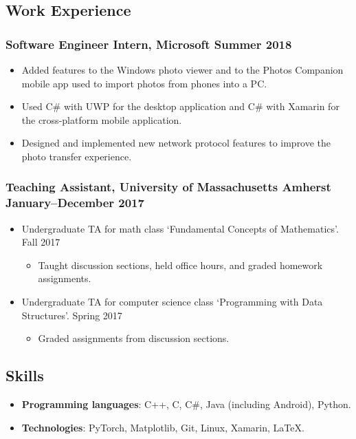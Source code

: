 \documentclass{article}
\begin{document}
	\subsection*{Work Experience}
		\subsubsection*{Software Engineer Intern, Microsoft \hfill \normalfont \normalsize Summer 2018}
        	\begin{itemize}[noitemsep,leftmargin=40pt]
            	\item Added features to the Windows photo viewer and to the Photos Companion mobile app used to import photos from phones into a PC.
                \item Used C\# with UWP for the desktop application and C\# with Xamarin for the cross-platform mobile application.
                \item Designed and implemented new network protocol features to improve the photo transfer experience.
            \end{itemize}
        \subsubsection*{Teaching Assistant, University of Massachusetts Amherst \hfill \normalfont \normalsize January--December 2017}
        	\begin{itemize}[noitemsep,leftmargin=40pt]
            	\item Undergraduate TA for math class `Fundamental Concepts of Mathematics'. \hfill \normalfont \normalsize Fall 2017
                \begin{itemize}[noitemsep]
                	\item Taught discussion sections, held office hours, and graded homework assignments.
                \end{itemize}
                \item Undergraduate TA for computer science class `Programming with Data Structures'. \hfill \normalfont \normalsize Spring 2017
                \begin{itemize}[noitemsep]
                	\item Graded assignments from discussion sections.
                \end{itemize}
            \end{itemize}
	\subsection*{Skills}
		\begin{itemize}[noitemsep,leftmargin=40pt]
			\item \textbf{Programming languages}: C++, C, C\#, Java (including Android), Python.
			\item \textbf{Technologies}: PyTorch, Matplotlib, Git, Linux, Xamarin, \LaTeX.
		\end{itemize}
\end{document}
